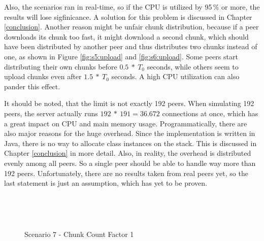 Also, the scenarios ran in real-time, so if the CPU is utilized by 95\,\% or more, the results will lose sigfinicance. A solution for this problem is discussed in Chapter \ref{conclusion}. Another reason might be unfair chunk distribution, because if a peer downloads its chunk too fast, it might download a second chunk, which should have been distributed by another peer and thus distributes two chunks instead of one, as shown in Figure \ref{fig:s5:upload} and \ref{fig:s6:upload}. Some peers start distributing their own chunks before $0.5\:*\:T_0$ seconds, while others seem to upload chunks even after $1.5\:*\:T_0$ seconds. A high CPU utilization can also pander this effect.

It should be noted, that the limit is not exactly 192 peers. When simulating 192 peers, the server actually runs $192\:*\:191=36.672$ connections at once, which has a great impact on CPU and main memory usage. Programmatically, there are also major reasons for the huge overhead. Since the implementation is written in Java, there is no way to allocate class instances on the stack. This is discussed in Chapter \ref{conclusion} in more detail. Also, in reality, the overhead is distributed evenly among all peers. So a single peer should be able to handle way more than 192 peers. Unfortunately, there are no results taken from real peers yet, so the last statement is just an assumption, which has yet to be proven.

\vfill



\pagebreak
\begin{figure}[!ht]
	\begin{center}	
		~ %

	 	~ %

		\caption{Scenario 7 - Chunk Count Factor 1}
		\label{fig:s7}
	\end{center}
\end{figure}
\vfill

